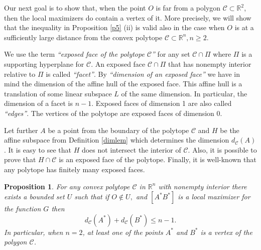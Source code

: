 \documentclass[a4paper,12pt]{amsart}
\newtheorem{prop}[thm]{Proposition}
\begin{document}
Our next goal is to show that, when the point $O$ is far from a polygon
$\mathcal C \subset \mathbb R^2$, then the local maximizers do contain a vertex of it.
More precisely, we will show that the
inequality in Proposition \ref{p5} (ii) is valid also in the case when $O$ is at
a sufficiently large distance from the convex polytope $\mathcal C \subset \mathbb R^n, n \geq 2$.
\smallskip

We use the term {\it ``exposed face of the polytope $\mathcal C$''} for any set $\mathcal C \cap \Pi$
where $\Pi$ is a supporting hyperplane for $\mathcal C$. An exposed face $\mathcal C \cap \Pi$ that
has nonempty interior relative to $\Pi$ is called {\it ``facet''}.
By {\it ``dimension of an exposed face''} we have in mind the dimension of the affine hull of the exposed face. This affine hull is a translation of some linear subspace $L$ of the same dimension.
In particular, the dimension of a facet is $n-1$.
Exposed faces of dimension 1 are also called {\it ``edges''}.
The vertices of the polytope are exposed faces of dimension 0.

Let further $A$ be a point from the boundary of the polytope $\mathcal C$ and $H$ be the
affine subspace from Definition \ref{dimlem} which determines the dimension $d_{\mathcal C}(A)$. It is easy to see that $H$ does not intersect the interior of $\mathcal C$.  Also, it is possible to prove
that $H \cap \mathcal C$ is an exposed face of the polytope.
Finally, it is well-known that any polytope has finitely many exposed faces.

\begin{prop}\label{p8}
For any convex polytope $\mathcal C$ in $\mathbb R^n$  with nonempty interior
there exists a bounded set $U$ such that if $O\not\in U,$ and $[A^*B^*]$ is a local
maximizer for the function $G$
then
$$d_{\mathcal C}(A^*)+d_{\mathcal C}(B^*) \le n-1.$$
In particular, when $n=2$, at least one of the points $A^*$ and $B^*$ is a vertex of the polygon $\mathcal C$.
\end{prop}
\end{document}
